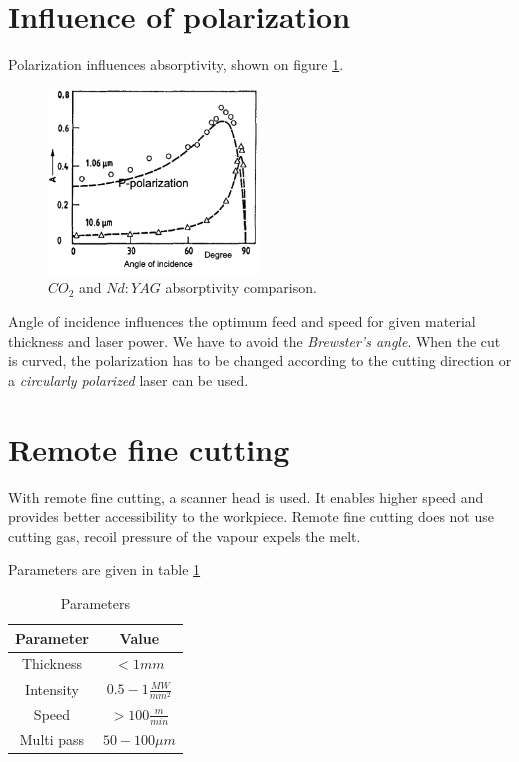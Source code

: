 \section{Influence of polarization}
Polarization influences absorptivity, shown on figure \ref{fig:cpolabs}. 

\begin{figure}[h!]
    \centering
    \includegraphics[width=0.5\textwidth]{slike/cpolabs.png}
    \caption{$CO_2$ and $Nd:YAG$ absorptivity comparison. \sln}
    \label{fig:cpolabs}
\end{figure}

Angle of incidence influences the optimum feed and speed for given material thickness and laser power. We have to 
avoid the \textit{Brewster's angle}.
When the cut is curved, the polarization has to be changed according to the cutting direction or a  \textit{circularly polarized} laser can be used. 

\section{Remote fine cutting}

With remote fine cutting, a scanner head is used. It enables higher speed and provides better accessibility to the workpiece. 
Remote fine cutting does not use cutting gas, recoil pressure of the vapour expels the melt.

Parameters are given in table \ref{tab:schparm}
\begin{table}[h!]
    \centering
    \begin{tabular}{|c|c|}
        \hline
        Parameter & Value \\
        \hline
        Thickness & $< 1 mm$ \\
        \hline
        Intensity & $0.5 - 1 \frac{MW}{mm^2}$\\
        \hline
        Speed & $> 100 \frac{m}{min}$ \\
        \hline
        Multi pass & $50-100 \mu m$ \\
        \hline

    \end{tabular}
    \caption{Parameters}
    \label{tab:schparm}
\end{table}


